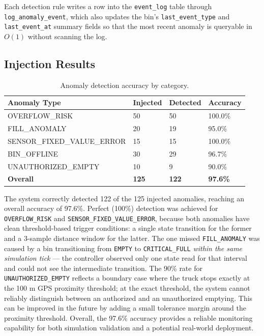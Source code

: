 \documentclass[12pt,a4paper]{report}
\begin{document}
\begin{itemize}[leftmargin=*]
\indent Each detection rule writes a row into the \texttt{event\_log} table through \texttt{log\_anomaly\_event}, which also updates the bin's \texttt{last\_event\_type} and \texttt{last\_event\_at} summary fields so that the most recent anomaly is queryable in $O(1)$ without scanning the log.
\clearpage
\subsection*{Injection Results}

\begin{table}[H]
\centering
\caption{Anomaly detection accuracy by category.}
\label{tab:anomaly_results}
\begin{tabular}{llll}
\toprule
\textbf{Anomaly Type} & \textbf{Injected} & \textbf{Detected} & \textbf{Accuracy} \\
\midrule
OVERFLOW\_RISK            & 50 & 50 & 100.0\% \\
FILL\_ANOMALY             & 20 & 19 & 95.0\% \\
SENSOR\_FIXED\_VALUE\_ERROR & 15 & 15 & 100.0\% \\
BIN\_OFFLINE              & 30 & 29 & 96.7\% \\
UNAUTHORIZED\_EMPTY       & 10 & 9  & 90.0\% \\
\midrule
\textbf{Overall}          & \textbf{125} & \textbf{122} & \textbf{97.6\%} \\
\bottomrule
\end{tabular}
\end{table}

\indent The system correctly detected 122 of the 125 injected anomalies, reaching an overall accuracy of 97.6\%. Perfect (100\%) detection was achieved for \texttt{OVERFLOW\_RISK} and \texttt{SENSOR\_FIXED\_VALUE\_ERROR}, because both anomalies have clean threshold-based trigger conditions: a single state transition for the former and a 3-sample distance window for the latter. The one missed \texttt{FILL\_ANOMALY} was caused by a bin transitioning from \texttt{EMPTY} to \texttt{CRITICAL\_FULL} \textit{within the same simulation tick} --- the controller observed only one state read for that interval and could not see the intermediate transition. The 90\% rate for \texttt{UNAUTHORIZED\_EMPTY} reflects a boundary case where the truck stops exactly at the 100 m GPS proximity threshold; at the exact threshold, the system cannot reliably distinguish between an authorized and an unauthorized emptying. This can be improved in the future by adding a small tolerance margin around the proximity threshold. Overall, the 97.6\% accuracy provides a reliable monitoring capability for both simulation validation and a potential real-world deployment.
\clearpage

\end{itemize}
\end{document}

